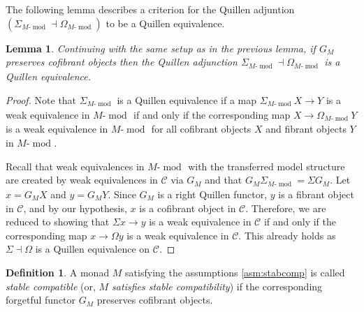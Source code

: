 \documentclass{article}
\newcommand{\cC}{\mathcal{C}}
\newcommand{\module}[2][]{#2\text{-}\modop_{#1}}
\DeclareMathOperator{\modop}{mod}
\newtheorem{lemma}[theorem]{Lemma}
\theoremstyle{definition}
\newtheorem{definition}[theorem]{Definition}
\theoremstyle{remark}
\begin{document}
The following lemma describes a criterion for the Quillen adjuntion $(\Sigma_{\module{M}} \dashv \Omega_{\module{M}})$ to be a
Quillen equivalence.

\begin{lemma} \label{lem:shloopqe}
    Continuing with the same setup as in the previous lemma, if  $G_{M}$  preserves cofibrant objects 
    then the Quillen adjunction $\Sigma_{\module{M}} \dashv \Omega_{\module{M}}$ is a Quillen equivalence. 
\end{lemma}
\begin{proof}
  Note that $\Sigma_{\module{M}}$ is a Quillen equivalence \cite[definition 1.3.12]{MR1650134} if a map
  $\Sigma_{\module{M}}X \rightarrow Y$ is a weak equivalence in $\module{M}$ if and only if the corresponding map 
  $X \rightarrow \Omega_{\module{M}}Y$ is a weak equivalence in $\module{M}$ for all cofibrant objects $X$ and
  fibrant objects $Y$ in $\module{M}$.

  Recall that weak equivalences in $\module{M}$ with the transferred model structure are created by weak equivalences in $\cC$
  via $G_{M}$ and that $G_{M}\Sigma_{\module{M}}=\Sigma G_{M}$.  
  Let $x = G_M X$ and $y = G_M Y$. Since $G_{M}$ is a right Quillen functor, $y$ is a fibrant object in $\cC$,
  and by our hypothesis, $x$ is a cofibrant object in $\cC$.
  Therefore, we are reduced to showing that $\Sigma x \rightarrow y$ is a weak equivalence in $\cC$ if and only if
  the corresponding map $x \rightarrow \Omega y$ is a weak equivalence in $\cC$. This already holds as 
  $\Sigma \dashv \Omega$ is a Quillen equivalence on $\cC$.
\end{proof}

\begin{definition} \label{def:stabcomp}
  A monad $M$ satisfying the assumptions \ref{asm:stabcomp} is called \emph{stable compatible}
  (or, \emph{$M$ satisfies stable compatibility}) if the corresponding forgetful functor $G_M$
  preserves cofibrant objects.    
\end{definition}
\end{document}
